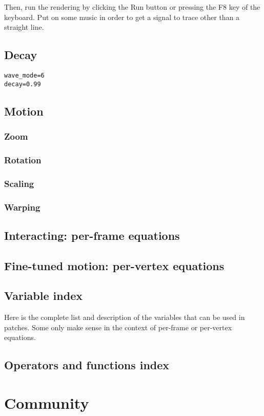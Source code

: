 \documentclass[11pt, a5paper, pagesize]{scrbook}
\begin{document}
Then, run the rendering by clicking the Run button or pressing the F8 key of the keyboard. Put on some music in order to get a signal to trace other than a straight line.

\section{Decay}

\begin{verbatim}
wave_mode=6
decay=0.99
\end{verbatim}


\section{Motion}
\subsection{Zoom}


\subsection{Rotation}

\subsection{Scaling}

\subsection{Warping}

\section{Interacting: per-frame equations}

\section{Fine-tuned motion: per-vertex equations}


\section{Variable index}
Here is the complete list and description of the variables that can be used in patches. Some only make sense in the context of per-frame or per-vertex equations.

\section{Operators and functions index}

\chapter{Community}
\end{document}
